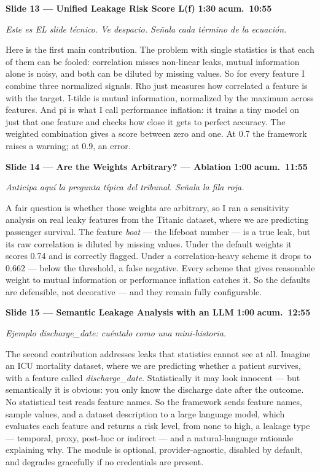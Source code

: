 \documentclass[11pt,a4paper]{article}
\newcommand{\slide}[6]{%
\begin{mdframed}[backgroundcolor=paleBlue, linecolor=upmBlue, linewidth=1pt,
                 roundcorner=4pt, skipabove=10pt, skipbelow=2pt,
                 innertopmargin=6pt, innerbottommargin=6pt]
\textbf{\color{upmBlue}Slide #1 --- #2}\hfill
\colorbox{upmOrange}{\color{white}\small\textbf{ #3 }}\;%
\colorbox{upmBlue}{\color{white}\small\textbf{ acum.\ #4 }}
\end{mdframed}
{\small\itshape\color{grayTxt}#5}\par\vspace{2pt}
#6\par\vspace{6pt}}
\begin{document}
\slide{13}{Unified Leakage Risk Score L(f)}{1:30}{10:55}
{Este es EL slide técnico. Ve despacio. Señala cada término de la ecuación.}
{Here is the first main contribution. The problem with single statistics is
that each of them can be fooled: correlation misses non-linear leaks, mutual
information alone is noisy, and both can be diluted by missing values. So for
every feature I combine three normalized signals. Rho just measures how
correlated a feature is with the target. I-tilde is mutual information,
normalized by the maximum across features. And pi is what I call performance
inflation: it trains a tiny model on just that one feature and checks how
close it gets to perfect accuracy. The weighted combination gives a score
between zero and one. At 0.7 the framework raises a
warning; at 0.9, an error.}

\slide{14}{Are the Weights Arbitrary? --- Ablation}{1:00}{11:55}
{Anticipa aquí la pregunta típica del tribunal. Señala la fila roja.}
{A fair question is whether those weights are arbitrary, so I ran a
sensitivity analysis on real leaky features from the Titanic dataset, where
we are predicting passenger survival. The feature
\emph{boat} --- the lifeboat number --- is a true leak, but its raw
correlation is diluted by missing values. Under the default weights it scores
0.74 and is correctly flagged. Under a correlation-heavy scheme it drops to
0.662 --- below the threshold, a false negative. Every scheme that gives
reasonable weight to mutual information or performance inflation catches it.
So the defaults are defensible, not decorative --- and they remain fully
configurable.}

\slide{15}{Semantic Leakage Analysis with an LLM}{1:00}{12:55}
{Ejemplo discharge\_date: cuéntalo como una mini-historia.}
{The second contribution addresses leaks that statistics cannot see at all.
Imagine an ICU mortality dataset, where we are predicting whether a patient
survives, with a feature called
\emph{discharge\_date}. Statistically it may look innocent --- but
semantically it is obvious: you only know the discharge date after the
outcome. No statistical test reads feature names. So the framework sends
feature names, sample values, and a dataset description to a large language
model, which evaluates each feature and
returns a risk level, from none to high, a leakage type --- temporal, proxy, post-hoc or indirect
--- and a natural-language rationale explaining why. The module is optional,
provider-agnostic, disabled by default, and degrades gracefully if no
credentials are present.}
\end{document}
